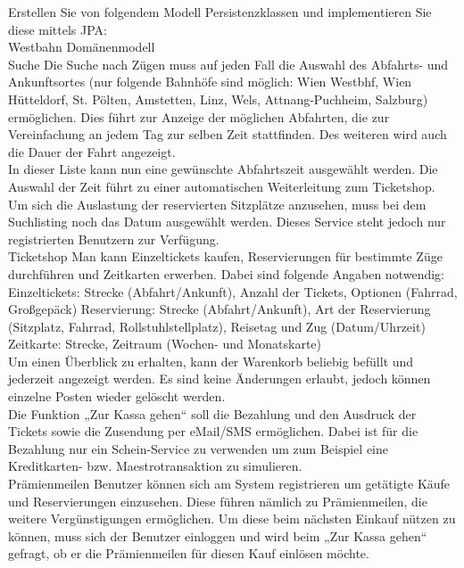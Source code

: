 \clearpage

Erstellen Sie von folgendem Modell Persistenzklassen und implementieren Sie diese mittels JPA:\\

Westbahn Domänenmodell\\

Suche
Die Suche nach Zügen muss auf jeden Fall die Auswahl des Abfahrts- und Ankunftsortes (nur folgende Bahnhöfe sind möglich: Wien Westbhf, Wien Hütteldorf, St. Pölten, Amstetten, Linz, Wels, Attnang-Puchheim, Salzburg) ermöglichen. Dies führt zur Anzeige der möglichen Abfahrten, die zur Vereinfachung an jedem Tag zur selben Zeit stattfinden. Des weiteren wird auch die Dauer der Fahrt angezeigt.\\

In dieser Liste kann nun eine gewünschte Abfahrtszeit ausgewählt werden. Die Auswahl der Zeit führt zu einer automatischen Weiterleitung zum Ticketshop.\\

Um sich die Auslastung der reservierten Sitzplätze anzusehen, muss bei dem Suchlisting noch das Datum ausgewählt werden. Dieses Service steht jedoch nur registrierten Benutzern zur Verfügung.\\

Ticketshop
Man kann Einzeltickets kaufen, Reservierungen für bestimmte Züge durchführen und Zeitkarten erwerben. Dabei sind folgende Angaben notwendig:\\

Einzeltickets: Strecke (Abfahrt/Ankunft), Anzahl der Tickets, Optionen (Fahrrad, Großgepäck)
Reservierung: Strecke (Abfahrt/Ankunft), Art der Reservierung (Sitzplatz, Fahrrad, Rollstuhlstellplatz), Reisetag und Zug (Datum/Uhrzeit)\\
Zeitkarte: Strecke, Zeitraum (Wochen- und Monatskarte)\\

Um einen Überblick zu erhalten, kann der Warenkorb beliebig befüllt und jederzeit angezeigt werden. Es sind keine Änderungen erlaubt, jedoch können einzelne Posten wieder gelöscht werden.\\

Die Funktion „Zur Kassa gehen“ soll die Bezahlung und den Ausdruck der Tickets sowie die Zusendung per eMail/SMS ermöglichen. Dabei ist für die Bezahlung nur ein Schein-Service zu verwenden um zum Beispiel eine Kreditkarten- bzw. Maestrotransaktion zu simulieren.\\

Prämienmeilen
Benutzer können sich am System registrieren um getätigte Käufe und Reservierungen einzusehen. Diese führen nämlich zu Prämienmeilen, die weitere Vergünstigungen ermöglichen. Um diese beim nächsten Einkauf nützen zu können, muss sich der Benutzer einloggen und wird beim „Zur Kassa gehen“ gefragt, ob er die Prämienmeilen für diesen Kauf einlösen möchte.\\

